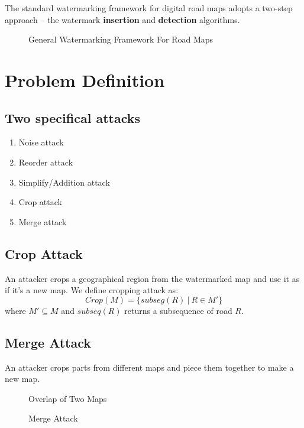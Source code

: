 \documentclass[
	paper=128mm:96mm,	%
	fontsize=11pt,					%
	pagesize,							%
	parskip=half-,					%
	numbers=noendperiod,	%
	captions=nooneline			%
	]{scrartcl}							%
\newcommand*{\myred}[1]{\textcolor{myred}{#1}}
\theoremstyle{mythmstyle}
\begin{document}
The standard watermarking framework for digital road maps 
 adopts a two-step approach -- the watermark \myred{\bf insertion} and \myred{\bf detection} algorithms.
\begin{figure}[h]
\centering
{}
\caption{General Watermarking Framework For Road Maps}
\label{fig:workflow}
\end{figure}
\clearpage

%
%
\section{Problem Definition}

\subsection*{Two specifical attacks}
\begin{enumerate}
	\item Noise attack
	\item Reorder attack
	\item Simplify/Addition attack
	\item \myred{Crop attack}
	\item \myred{Merge attack}
\end{enumerate}	
\clearpage
%
%

\subsection*{Crop Attack}
An attacker crops a geographical region from the watermarked map
and use it as if it's a new map.
We define cropping attack as:
\[
Crop(M) = \{ subseg(R) ~|~ R \in M'\}
\]
where 
$M' \subseteq M$ and $subseq (R)$ returns a subsequence of road $R$.

\clearpage

\subsection*{Merge Attack}
An attacker crops parts from different maps and piece
them together to make a new map.
\begin{figure}[h]
\centering
{}
\caption{Overlap of Two Maps}
\label{fig:17}
\end{figure}

\begin{figure}[h]
\centering
{}
\caption{Merge Attack}
\label{fig:merge}
\end{figure}
\end{document}
